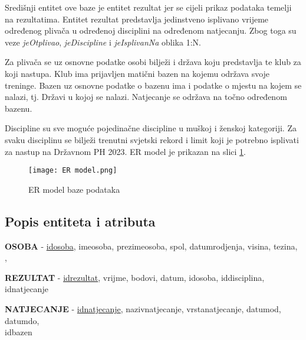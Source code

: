 \documentclass[times, utf8, zavrsni]{fer}
\begin{document}
Središnji entitet ove baze je entitet rezultat jer se cijeli prikaz podataka temelji na rezultatima. Entitet rezultat predstavlja jedinstveno isplivano vrijeme određenog plivača
u određenoj disciplini na određenom natjecanju. Zbog toga su veze \textit{jeOtplivao}, \textit{jeDiscipline} i \textit{jeIsplivanNa} oblika 1:N. 

\vspace{\baselineskip}

Za plivača se uz osnovne podatke osobi bilježi i država koju predstavlja te klub za koji nastupa. Klub ima prijavljen matični bazen na kojemu održava svoje treninge.
Bazen uz osnovne podatke o bazenu ima i podatke o mjestu na kojem se nalazi, tj. Državi u kojoj se nalazi. Natjecanje se održava na točno određenom bazenu.

\vspace{\baselineskip}

Discipline su sve moguće pojedinačne discipline u muškoj i ženskoj kategoriji. Za svaku disciplinu se bilježi trenutni svjetski rekord i limit koji je potrebno isplivati
za nastup na Državnom PH 2023. ER model je prikazan na slici \ref*{fig:ER model}.

\clearpage

\begin{figure}[!h]
    \centering
    \hspace*{-2.5cm}\texttt{[image: ER model.png]}
    \centering
    \caption{ER model baze podataka}
    \label{fig:ER model}
\end{figure}

\subsection{Popis entiteta i atributa}


\hspace*{0.6cm}\textbf{OSOBA} - \underline{idosoba}, imeosoba, prezimeosoba, spol, datumrodjenja, visina, tezina, , 

\vspace{\baselineskip}

\textbf{REZULTAT} - \underline{idrezultat}, vrijme, bodovi, datum, idosoba, iddisciplina, idnatjecanje

\vspace{\baselineskip}

\textbf{NATJECANJE} - \underline{idnatjecanje}, nazivnatjecanje, vrstanatjecanje, datumod, datumdo, \\
\indent idbazen
\end{document}
